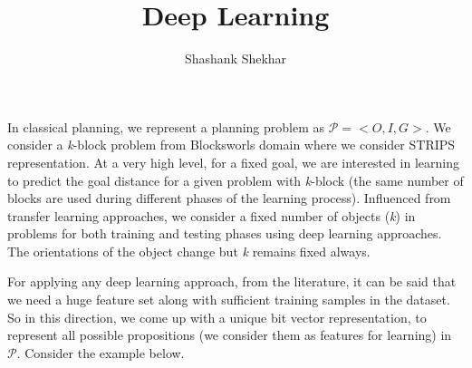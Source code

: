 \documentclass[]{article}
\begin{document}
\title{Deep Learning}
\author{Shashank Shekhar}
\maketitle
%
%
\noindent In classical planning, we represent a planning problem as $\mathcal{P}={<O, I, G>}$. 
We consider a \emph{k}-block problem from Blocksworls domain where we consider STRIPS representation. 
%
At a very high level, for a fixed goal, we are interested in learning to predict the goal distance for a given problem with \emph{k}-block (the same number of blocks are used during different phases of the learning process).
%
Influenced from transfer learning approaches, we consider a fixed number of objects (\emph{k}) in problems for both training and testing phases using deep learning approaches.
The orientations of the object change but \emph{k} remains fixed always.
%

For applying any deep learning approach, from the literature, it can be said that we need a huge feature set along with sufficient training samples in the dataset.
So in this direction, we come up with a unique bit vector representation, to represent all possible propositions (we consider them as features for learning) in $\mathcal{P}$.
Consider the example below.
%
\end{document}
